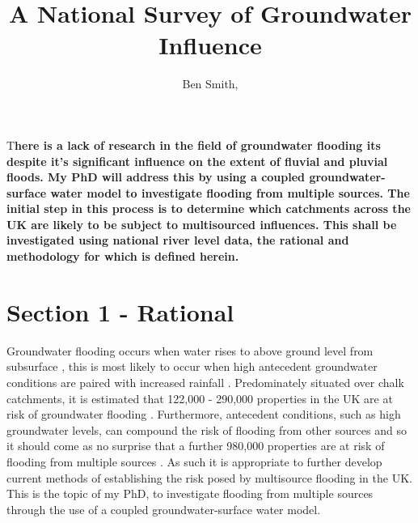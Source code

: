 \documentclass[DIV=calc, paper=a4, fontsize=11pt, twocolumn]{scrartcl}	 %
\title{A National Survey of Groundwater Influence} %
\author{Ben Smith, } %
\date{} %
\newcommand{\initial}[1]{ %
\lettrine[lines=3,lhang=0.3,nindent=0em]{
\color{DarkGoldenrod}
{\textsf{#1}}}{}}
\begin{document}
\maketitle %

\thispagestyle{fancy} %


\initial{T}\textbf{here is a lack of research in the field of groundwater flooding its despite it's significant influence on the extent of fluvial and pluvial floods. My PhD will address this by using a coupled groundwater-surface water model to investigate flooding from multiple sources. The initial step in this process is to determine which catchments across the UK are likely to be subject to multisourced influences. This shall be investigated using national river level data, the rational and methodology for which is defined herein.}


\section*{Section 1 - Rational}
Groundwater flooding occurs when water rises to above ground level from subsurface \citep{Naughton2015}, this is most likely to occur when high antecedent groundwater conditions are paired with increased rainfall \citep{Macdonald2008}. Predominately situated over chalk catchments, it is estimated that 122,000 - 290,000 properties in the UK are at risk of groundwater flooding \citep{McKenzie2015}. Furthermore, antecedent conditions, such as high groundwater levels, can compound the risk of flooding from other sources \citep{An2014} and so it should come as no surprise that a further 980,000 properties are at risk of flooding from multiple sources \citep{McKenzie2015}. As such it is appropriate to further develop current methods of establishing the risk posed by multisource flooding in the UK. This is the topic of my PhD, to investigate flooding from multiple sources through the use of a coupled groundwater-surface water model.
\end{document}
